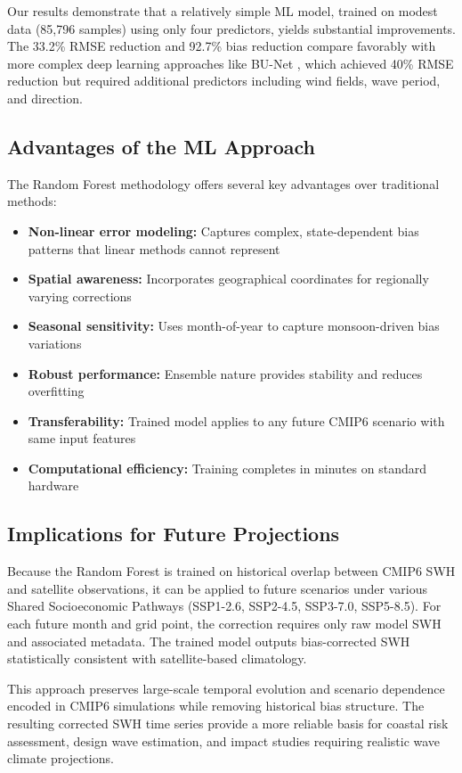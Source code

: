 \documentclass[conference]{IEEEtran}
\begin{document}
Our results demonstrate that a relatively simple ML model, trained on modest data (85,796 samples) using only four predictors, yields substantial improvements. The 33.2\% RMSE reduction and 92.7\% bias reduction compare favorably with more complex deep learning approaches like BU-Net \cite{sun2022}, which achieved 40\% RMSE reduction but required additional predictors including wind fields, wave period, and direction.

\subsection{Advantages of the ML Approach}

The Random Forest methodology offers several key advantages over traditional methods:
\begin{itemize}
    \item \textbf{Non-linear error modeling:} Captures complex, state-dependent bias patterns that linear methods cannot represent
    \item \textbf{Spatial awareness:} Incorporates geographical coordinates for regionally varying corrections
    \item \textbf{Seasonal sensitivity:} Uses month-of-year to capture monsoon-driven bias variations
    \item \textbf{Robust performance:} Ensemble nature provides stability and reduces overfitting
    \item \textbf{Transferability:} Trained model applies to any future CMIP6 scenario with same input features
    \item \textbf{Computational efficiency:} Training completes in minutes on standard hardware
\end{itemize}

\subsection{Implications for Future Projections}

Because the Random Forest is trained on historical overlap between CMIP6 SWH and satellite observations, it can be applied to future scenarios under various Shared Socioeconomic Pathways (SSP1-2.6, SSP2-4.5, SSP3-7.0, SSP5-8.5). For each future month and grid point, the correction requires only raw model SWH and associated metadata. The trained model outputs bias-corrected SWH statistically consistent with satellite-based climatology.

This approach preserves large-scale temporal evolution and scenario dependence encoded in CMIP6 simulations while removing historical bias structure. The resulting corrected SWH time series provide a more reliable basis for coastal risk assessment, design wave estimation, and impact studies requiring realistic wave climate projections.
\end{document}
